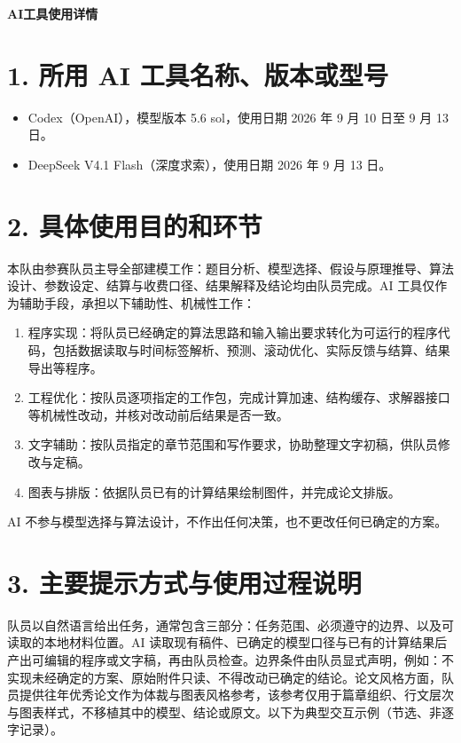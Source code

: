\documentclass[12pt,a4paper,fontset=fandol]{ctexart}
\begin{document}
\begin{center}
{\LARGE\bfseries AI工具使用详情\par}
\end{center}

\section*{1. 所用 AI 工具名称、版本或型号}

\begin{itemize}[leftmargin=2em]
\item Codex（OpenAI），模型版本 5.6 sol，使用日期 2026 年 9 月 10 日至 9 月 13 日。
\item DeepSeek V4.1 Flash（深度求索），使用日期 2026 年 9 月 13 日。
\end{itemize}

\section*{2. 具体使用目的和环节}

本队由参赛队员主导全部建模工作：题目分析、模型选择、假设与原理推导、算法设计、参数设定、结算与收费口径、结果解释及结论均由队员完成。AI 工具仅作为辅助手段，承担以下辅助性、机械性工作：

\begin{enumerate}[leftmargin=2em]
\item 程序实现：将队员已经确定的算法思路和输入输出要求转化为可运行的程序代码，包括数据读取与时间标签解析、预测、滚动优化、实际反馈与结算、结果导出等程序。
\item 工程优化：按队员逐项指定的工作包，完成计算加速、结构缓存、求解器接口等机械性改动，并核对改动前后结果是否一致。
\item 文字辅助：按队员指定的章节范围和写作要求，协助整理文字初稿，供队员修改与定稿。
\item 图表与排版：依据队员已有的计算结果绘制图件，并完成论文排版。
\end{enumerate}

AI 不参与模型选择与算法设计，不作出任何决策，也不更改任何已确定的方案。

\section*{3. 主要提示方式与使用过程说明}

队员以自然语言给出任务，通常包含三部分：任务范围、必须遵守的边界、以及可读取的本地材料位置。AI 读取现有稿件、已确定的模型口径与已有的计算结果后产出可编辑的程序或文字稿，再由队员检查。边界条件由队员显式声明，例如：不实现未经确定的方案、原始附件只读、不得改动已确定的结论。论文风格方面，队员提供往年优秀论文作为体裁与图表风格参考，该参考仅用于篇章组织、行文层次与图表样式，不移植其中的模型、结论或原文。以下为典型交互示例（节选、非逐字记录）。
\end{document}
